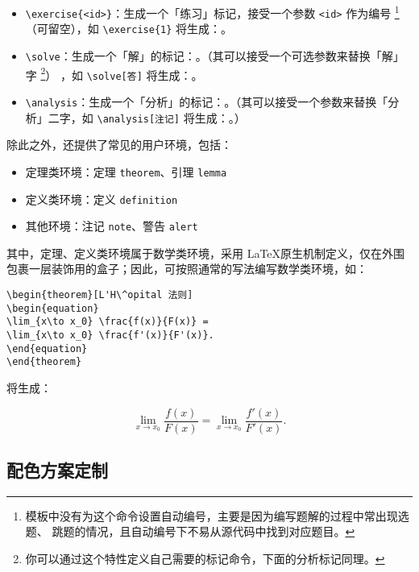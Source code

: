 \documentclass[
  10pt,
  twoside,
  openany,
  b5paper, %
  colorscheme = basic, %
]{qyxf-book}
\begin{document}
\begin{itemize}
  \item \verb|\exercise{<id>}|：生成一个「练习」标记，接受一个参数 \verb|<id>| 作为编号
        \footnote{模板中没有为这个命令设置自动编号，主要是因为编写题解的过程中常出现选题、
        跳题的情况，且自动编号下不易从源代码中找到对应题目。}
        （可留空），如 \verb|\exercise{1}| 将生成：。
  \item \verb|\solve|：生成一个「解」的标记：\solve。（其可以接受一个可选参数来替换「解」字
  \footnote{你可以通过这个特性定义自己需要的标记命令，下面的分析标记同理。}）
  ，如 \verb|\solve[答]| 将生成：\solve[答]。
  \item \verb|\analysis|：生成一个「分析」的标记：\analysis。（其可以接受一个参数来替换「分析」二字，如 \verb|\analysis[注记]| 将生成：\analysis[注记]。）
\end{itemize}

除此之外，还提供了常见的用户环境，包括：
\begin{itemize}
  \item 定理类环境：定理 \verb|theorem|、引理 \verb|lemma|
  \item 定义类环境：定义 \verb|definition|
  \item 其他环境：注记 \verb|note|、警告 \verb|alert|
\end{itemize}
其中，定理、定义类环境属于数学类环境，采用 \LaTeX 原生机制定义，仅在外围包裹一层装饰用的盒子；因此，可按照通常的写法编写数学类环境，如：
\begin{tcolorbox}
  \begin{verbatim}
\begin{theorem}[L'H\^opital 法则]
\begin{equation}
\lim_{x\to x_0} \frac{f(x)}{F(x)} =
\lim_{x\to x_0} \frac{f'(x)}{F'(x)}.
\end{equation}
\end{theorem}
\end{verbatim}
\end{tcolorbox}
将生成：
\begin{theorem}[L'H\^opital 法则]
\begin{equation}
\lim_{x\to x_0} \frac{f(x)}{F(x)} =
\lim_{x\to x_0} \frac{f'(x)}{F'(x)}.
\end{equation}
\end{theorem}

\subsection{配色方案定制}
\end{document}

